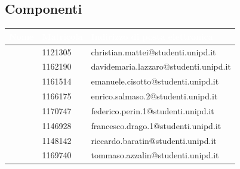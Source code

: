 \clearpage
\subsection{Componenti}
{
	\renewcommand{\arraystretch}{2}
	\begin{longtable}{ C{4cm} C{2cm} C{8cm} }
		\textcolor{white}{\textbf{Nome}} & \textcolor{white}{\textbf{Matricola}} & \textcolor{white}{\textbf{Indirizzo di posta elettronica}}\\\endhead	
		
		\MC{} & 1121305 & christian.mattei@studenti.unipd.it \\
		\LD{} & 1162190 & davidemaria.lazzaro@studenti.unipd.it\\
		\CE{} & 1161514 & emanuele.cisotto@studenti.unipd.it\\
		\SE{} & 1166175 & enrico.salmaso.2@studenti.unipd.it \\
		\PF{} & 1170747 & federico.perin.1@studenti.unipd.it \\
		\DF{} & 1146928 & francesco.drago.1@studenti.unipd.it \\
		\BR{} & 1148142 & riccardo.baratin@studenti.unipd.it \\
		\AT{} & 1169740 & tommaso.azzalin@studenti.unipd.it \\
		
		
	\end{longtable}
}